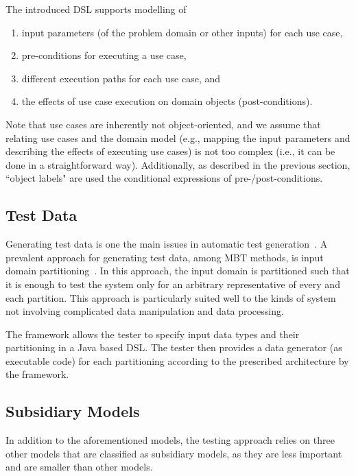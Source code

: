 The introduced DSL  supports modelling  of
\begin{enumerate}
	\item input parameters (of the problem domain or other inputs) for each use case,
	
	\item pre-conditions for executing a use case, 
	
	\item different execution paths for each use case, and
	
	\item the effects of use case execution on domain objects (post-conditions).
\end{enumerate}

Note that use cases are inherently not object-oriented, and we assume that relating use cases and the domain model (e.g., mapping the input parameters and describing the effects of executing use cases) is not too complex (i.e., it can be done in a straightforward way). Additionally, as described in the previous section, ``object labels" are used the conditional expressions of pre-/post-conditions.

\subsection{Test Data}
\label{sec:framework-overview-test-data}
Generating test data is one the main issues in automatic test generation~\cite{}. A prevalent approach for generating test data, among MBT methods, is input domain partitioning~\cite{Ammann2008}. In this approach, the input domain is partitioned such that it is enough to test the system only for an arbitrary representative of every and each partition. This approach is particularly suited well to the kinds of system not involving complicated data manipulation and data processing. 

The framework allows the tester to specify input data types and their partitioning in a Java based DSL. The tester then provides a data generator (as executable code) for each partitioning  according to the prescribed architecture by the framework. 



\subsection{Subsidiary Models}
\label{sec:framework-overview-subsidiary}
In addition to the aforementioned models, the testing approach relies on three other models that are classified as subsidiary models, as they are less important and are smaller than other models. 

